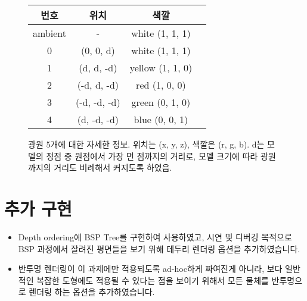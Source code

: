 \documentclass{article}
\begin{document}
\begin{figure}[ht]
  \centering
  \begin{tabular}{c c c c}
    번호 & 위치 & 색깔 \\
    \midrule
    ambient & - & white (1, 1, 1) \\
    0 & (0, 0, d) & white (1, 1, 1) \\
    1 & (d, d, -d) & yellow (1, 1, 0) \\
    2 & (-d, d, -d) & red (1, 0, 0) \\
    3 & (-d, -d, -d) & green (0, 1, 0) \\
    4 & (d, -d, -d) & blue (0, 0, 1) \\
  \end{tabular}
  \caption{
    광원 5개에 대한 자세한 정보.
    위치는 (x, y, z), 색깔은 (r, g, b).
    d는 모델의 정점 중 원점에서 가장 먼 점까지의 거리로, 모델 크기에 따라 광원까지의 거리도 비례해서 커지도록 하였음.
    \label{fig:light}
  }
\end{figure}

\section{추가 구현}

\begin{itemize}
  \item Depth ordering에 BSP Tree를 구현하여 사용하였고, 시연 및 디버깅 목적으로 BSP 과정에서 잘려진 평면들을 보기 위해 테두리 렌더링 옵션을 추가하였습니다.
  \item 반투명 렌더링이 이 과제에만 적용되도록 ad-hoc하게 짜여진게 아니라, 보다 일반적인 복잡한 도형에도 적용될 수 있다는 점을 보이기 위해서 모든 물체를 반투명으로 렌더링 하는 옵션을 추가하였습니다.
\end{itemize}
\end{document}
